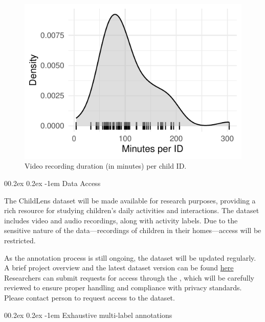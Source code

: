 \documentclass[
  man,floatsintext]{apa6}
\makeatletter
\let\oldparagraph\paragraph
\renewcommand{\paragraph}{
    \@ifstar
      \xxxParagraphStar
      \xxxParagraphNoStar
  }
\newcommand{\xxxParagraphStar}[1]{\oldparagraph*{#1}\mbox{}}
\newcommand{\xxxParagraphNoStar}[1]{\oldparagraph{#1}\mbox{}}
\renewcommand{\paragraph}{\@startsection{paragraph}{4}{\parindent}%
  {0\baselineskip \@plus 0.2ex \@minus 0.2ex}%
  {-1em}%
  {\normalfont\normalsize\bfseries\itshape\typesectitle}}
\makeatother
\begin{document}
\begin{figure}
\centering
\includegraphics{ChildLens_paper_files/figure-latex/minutes-per-child-1.pdf}
\caption{\label{fig:minutes-per-child}Video recording duration (in minutes) per child ID.}
\end{figure}

\paragraph{Data Access}\label{data-access}

The ChildLens dataset will be made available for research purposes, providing a rich resource for studying children's daily activities and interactions. The dataset includes video and audio recordings, along with activity labels. Due to the sensitive nature of the data---recordings of children in their homes---access will be restricted.

As the annotation process is still ongoing, the dataset will be updated regularly. A brief project overview and the latest dataset version can be found \href{https://www.eva.mpg.de/comparative-cultural-psychology/technical-development/childlens/}{here} Researchers can submit requests for access through the , which will be carefully reviewed to ensure proper handling and compliance with privacy standards. Please contact person to request access to the dataset.

\paragraph{Exhaustive multi-label annotations}\label{exhaustive-multi-label-annotations}
\end{document}
